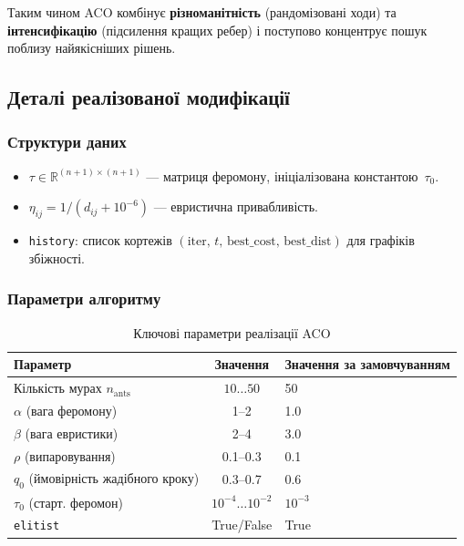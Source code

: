 \documentclass[12pt,a4paper]{article}
\begin{document}
Таким чином ACO комбінує \textbf{різноманітність} (рандомізовані
ходи) та \textbf{інтенсифікацію} (підсилення кращих ребер) і
поступово концентрує пошук поблизу найякісніших рішень.

\subsection{Деталі реалізованої модифікації}
\subsubsection{Структури даних}
\begin{itemize}
  \item \(\tau\in\mathbb R^{(n+1)\times(n+1)}\) — матриця феромону,
        ініціалізована константою~\(\tau_0\).
  \item \(\eta_{ij}=1/(d_{ij}+10^{-6})\) — евристична привабливість.
  \item \texttt{history}: список кортежів
        \((\text{iter},\,t,\,\text{best\_cost},\,\text{best\_dist})\)
        для графіків збіжності.
\end{itemize}

\subsubsection{Параметри алгоритму}
\begin{table}[h]
\centering
\begin{tabular}{lcl}
\toprule
Параметр & Значення & Значення за замовчуванням \\
\midrule
Кількість мурах $n_{\text{ants}}$ & $10\dots 50$ & 50 \\
$\alpha$ (вага феромону)          & 1–2 & 1.0 \\
$\beta$ (вага евристики)          & 2–4 & 3.0 \\
$\rho$ (випаровування)            & 0.1–0.3 & 0.1 \\
$q_0$ (ймовірність жадібного кроку) & 0.3–0.7 & 0.6 \\
$\tau_0$ (старт. феромон)          & $10^{-4}\dots 10^{-2}$ & $10^{-3}$ \\
\texttt{elitist}                  & True/False & True \\
\bottomrule
\end{tabular}
\caption{Ключові параметри реалізації ACO}
\end{table}
\end{document}
